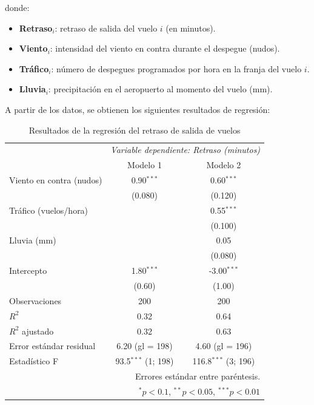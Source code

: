 \documentclass[10pt,a4paper]{article}
\begin{document}
\begin{enumerate}
donde:

\begin{itemize}
    \item \textbf{Retraso$_i$}: retraso de salida del vuelo $i$ (en minutos).
    \item \textbf{Viento$_i$}: intensidad del viento en contra durante el despegue (nudos).
    \item \textbf{Tráfico$_i$}: número de despegues programados por hora en la franja del vuelo $i$.
    \item \textbf{Lluvia$_i$}: precipitación en el aeropuerto al momento del vuelo (mm).
\end{itemize}

A partir de los datos, se obtienen los siguientes resultados de regresión:

\begin{table}[H] 
\centering
\caption{Resultados de la regresión del retraso de salida de vuelos}
\label{tab:aviacion_reg}
\begin{tabular}{l|c|c}
\toprule
 & \multicolumn{2}{c}{\textit{Variable dependiente: Retraso (minutos)}} \\

 & Modelo 1 & Modelo 2 \\
\hline
Viento en contra (nudos) & 0.90$^{***}$ & 0.60$^{***}$ \\
 & (0.080) & (0.120) \\
Tráfico (vuelos/hora) &  & 0.55$^{***}$ \\
 &  & (0.100) \\
Lluvia (mm) &  & 0.05 \\
 &  & (0.080) \\
Intercepto & 1.80$^{***}$ & -3.00$^{***}$ \\
 & (0.60) & (1.00) \\
\hline
Observaciones & 200 & 200 \\
$R^2$ & 0.32 & 0.64 \\
$R^2$ ajustado & 0.32 & 0.63 \\
Error estándar residual & 6.20 (gl = 198) & 4.60 (gl = 196) \\
Estadístico F & 93.5$^{***}$ (1; 198) & 116.8$^{***}$ (3; 196) \\
\hline
\multicolumn{3}{r}{\footnotesize Errores estándar entre paréntesis.} \\
\multicolumn{3}{r}{\footnotesize $^{*}p<0.1$, $^{**}p<0.05$, $^{***}p<0.01$}
\end{tabular}
\end{table}


\end{enumerate}
\end{document}
